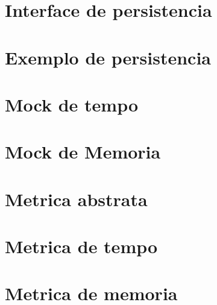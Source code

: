 \documentclass[12pt]{tcc}
\begin{document}
\section{Interface de persistencia}


\section{Exemplo de persistencia}


\section{Mock de tempo}


\section{Mock de Memoria}


\section{Metrica abstrata}


\section{Metrica de tempo}


\section{Metrica de memoria}

\end{document}
